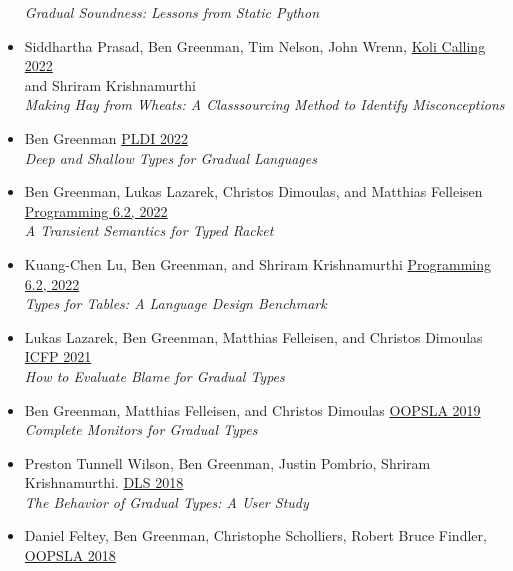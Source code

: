 \documentclass[11pt]{article}
\begin{document}
\begin{itemize}
    \emph{Gradual Soundness: Lessons from Static Python} \hfill {}
\item
  Siddhartha Prasad, Ben Greenman, Tim Nelson, John Wrenn, \hfill \href{https://www.kolicalling.fi/}{Koli Calling 2022} \\
  and Shriram Krishnamurthi \\
    \emph{Making Hay from Wheats: A Classsourcing Method to Identify Misconceptions} \hfill {}
\item
  Ben Greenman \hfill \href{https://pldi22.sigplan.org/}{PLDI 2022} \\
    \emph{Deep and Shallow Types for Gradual Languages} \hfill {}
\item
  Ben Greenman, Lukas Lazarek, Christos Dimoulas, and Matthias Felleisen \hfill \href{https://2022.programming-conference.org/}{Programming 6.2, 2022} \\
    \emph{A Transient Semantics for Typed Racket} \hfill {} %
\item
  Kuang-Chen Lu, Ben Greenman, and Shriram Krishnamurthi \hfill \href{https://2022.programming-conference.org/}{Programming 6.2, 2022} \\
    \emph{Types for Tables: A Language Design Benchmark} \hfill {}
\item
  Lukas Lazarek, Ben Greenman, Matthias Felleisen, and Christos Dimoulas \hfill \href{https://icfp21.sigplan.org/}{ICFP 2021} \\
  \emph{How to Evaluate Blame for Gradual Types} \hfill {} %
\item
  Ben Greenman, Matthias Felleisen, and Christos Dimoulas \hfill \href{https://conf.researchr.org/track/splash-2019/splash-2019-OOPSLA}{OOPSLA 2019} \\
  \emph{Complete Monitors for Gradual Types} \hfill {}
\item
  Preston Tunnell Wilson, Ben Greenman, Justin Pombrio, Shriram Krishnamurthi. \hfill \href{https://conf.researchr.org/track/dls-2018/dls-2018}{DLS 2018} \\
  \emph{The Behavior of Gradual Types: A User Study} \hfill {}
\item
  Daniel Feltey, Ben Greenman, Christophe Scholliers, Robert Bruce Findler, \hfill \href{https://2018.splashcon.org/track/splash-2018-OOPSLA}{OOPSLA 2018} \\

\end{itemize}
\end{document}
